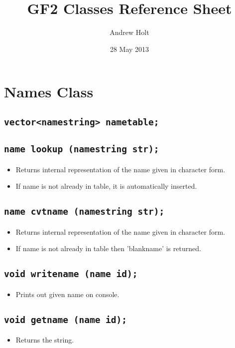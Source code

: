 \documentclass[a4paper,11pt]{article}  %
\title{GF2 Classes Reference Sheet}
\author{Andrew Holt}
\date{28 May 2013}
\begin{document}
\maketitle

\section{Names Class}

\subsection*{\texttt{vector<namestring> nametable;}}

\subsection*{\texttt{name lookup (namestring str);}}
\begin{itemize}
  \item Returns internal representation of the name given in character form.
  \item If name is not already in table, it is automatically inserted.
\end{itemize}

\subsection*{\texttt{name cvtname (namestring str);}}
\begin{itemize}
  \item Returns internal representation of the name given in character form.
  \item If name is not already in table then 'blankname' is returned.
\end{itemize}

\subsection*{\texttt{void writename (name id);}}
\begin{itemize}
  \item Prints out given name on console.
\end{itemize}

\subsection*{\texttt{void getname (name id);}}
\begin{itemize}
  \item Returns the string.
\end{itemize}
\end{document}
